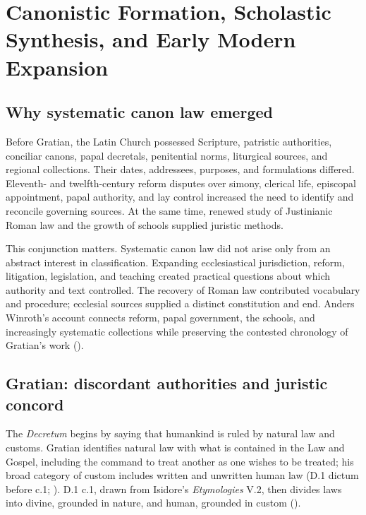 \section{Canonistic Formation, Scholastic Synthesis, and Early Modern Expansion}

\subsection{Why systematic canon law emerged}

Before Gratian, the Latin Church possessed Scripture, patristic authorities, conciliar canons, papal decretals, penitential norms, liturgical sources, and regional collections. Their dates, addressees, purposes, and formulations differed. Eleventh- and twelfth-century reform disputes over simony, clerical life, episcopal appointment, papal authority, and lay control increased the need to identify and reconcile governing sources. At the same time, renewed study of Justinianic Roman law and the growth of schools supplied juristic methods.

This conjunction matters. Systematic canon law did not arise only from an abstract interest in classification. Expanding ecclesiastical jurisdiction, reform, litigation, legislation, and teaching created practical questions about which authority and text controlled. The recovery of Roman law contributed vocabulary and procedure; ecclesial sources supplied a distinct constitution and end. Anders Winroth's account connects reform, papal government, the schools, and increasingly systematic collections while preserving the contested chronology of Gratian's work ().

\subsection{Gratian: discordant authorities and juristic concord}

The \emph{Decretum} begins by saying that humankind is ruled by natural law and customs. Gratian identifies natural law with what is contained in the Law and Gospel, including the command to treat another as one wishes to be treated; his broad category of custom includes written and unwritten human law (D.1 dictum before c.1; ). D.1 c.1, drawn from Isidore's \emph{Etymologies} V.2, then divides laws into divine, grounded in nature, and human, grounded in custom ().

